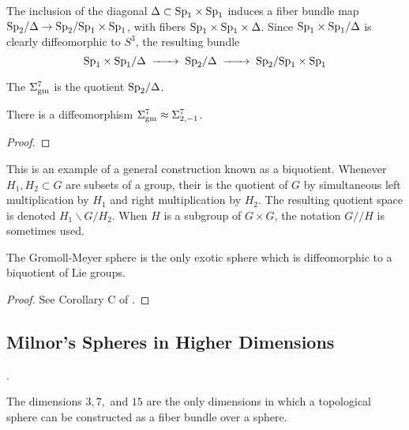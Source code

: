 The inclusion of the diagonal $\Delta \subset \mathrm{Sp}_1\times \mathrm{Sp}_1$ induces a fiber bundle map $\mathrm{Sp}_2/\Delta \to \mathrm{Sp}_2/\mathrm{Sp}_1\times \mathrm{Sp}_1$, with fibers $\mathrm{Sp}_1\times \mathrm{Sp}_1\times \Delta$. Since $\mathrm{Sp}_1\times \mathrm{Sp}_1/\Delta$ is clearly diffeomorphic to $S^3$, the resulting bundle
\[
	\Sp_1\times\Sp_1/\Delta \lkxto \Sp_2/\Delta \lkxto \Sp_2/\Sp_1\times \Sp_1
\]

\begin{definition}
	The  $\Sigma^7_{\mathrm{gm}}$ is the quotient $\mathrm{Sp}_2/\Delta$.
\end{definition}

\begin{proposition}
	There is a diffeomorphism $\Sigma^7_{\mathrm{gm}} \approx \Sigma^7_{2,-1}$.
\end{proposition}
\begin{proof}
\end{proof}


This is an example of a general construction known as a biquotient. Whenever $H_1,H_2\subset G$ are subsets of a group, their  is the quotient of $G$ by simultaneous left multiplication by $H_1$ and right multiplication by $H_2$. The resulting quotient space is denoted $H_1\backslash G/H_2$. When $H$ is a subgroup of $G\times G$, the notation $G/\!/H$ is sometimes used.

\begin{theorem}
	The Gromoll-Meyer sphere is the only exotic sphere which is diffeomorphic to a biquotient of Lie groups.
\end{theorem}
\begin{proof}
	See Corollary C of \cite{KZ2004biquotients}.
\end{proof}

\subsection{Milnor's Spheres in Higher Dimensions}

\cite{shimada1957differentiable}.




\begin{theorem}[Hopf]\label{thm:hopf-homotopy-spheres}
	The dimensions $3, 7,$ and $15$ are the only dimensions in which a topological sphere can be constructed as a fiber bundle over a sphere.
\end{theorem}

